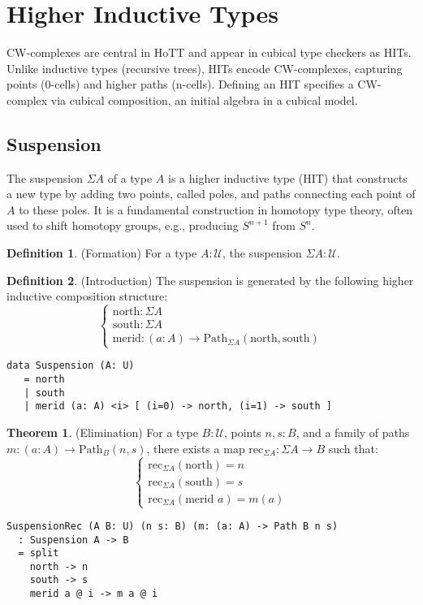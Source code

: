 \documentclass{article}
\theoremstyle{definition}
\newtheorem{theorem}{Theorem}
\newtheorem{definition}{Definition}
\begin{document}
\newpage
\section{Higher Inductive Types}
CW-complexes are central in HoTT and appear in cubical type checkers as HITs. Unlike inductive types (recursive trees), HITs encode CW-complexes, capturing points (0-cells) and higher paths (n-cells). Defining an HIT specifies a CW-complex via cubical composition, an initial algebra in a cubical model.

\subsection{Suspension}
The suspension $\Sigma A$ of a type $A$ is a higher inductive type (HIT) that constructs a new type by adding two points, called poles, and paths connecting each point of $A$ to these poles. It is a fundamental construction in homotopy type theory, often used to shift homotopy groups, e.g., producing $S^{n+1}$ from $S^n$.

\begin{definition} (Formation)
For a type $A : \mathcal{U}$, the suspension $\Sigma A : \mathcal{U}$.
\end{definition}

\begin{definition} (Introduction)
The suspension is generated by the following higher inductive composition structure:
\[
\begin{cases}
\text{north} : \Sigma A \\
\text{south} : \Sigma A \\
\text{merid} : (a : A) \to \text{Path}_{\Sigma A} (\text{north}, \text{south})
\end{cases}
\]
\begin{lstlisting}
data Suspension (A: U)
   = north
   | south
   | merid (a: A) <i> [ (i=0) -> north, (i=1) -> south ]
\end{lstlisting}
\end{definition}

\begin{theorem} (Elimination)
For a type $B : \mathcal{U}$, points $n, s : B$, and a family of paths $m : (a : A) \to \text{Path}_B (n, s)$, there exists a map $\text{rec}_{\Sigma A} : \Sigma A \to B$ such that:
\[
\begin{cases}
\text{rec}_{\Sigma A}(\text{north}) = n \\
\text{rec}_{\Sigma A}(\text{south}) = s \\
\text{rec}_{\Sigma A}(\text{merid } a) = m(a)
\end{cases}
\]
\begin{lstlisting}
SuspensionRec (A B: U) (n s: B) (m: (a: A) -> Path B n s)
  : Suspension A -> B
  = split
    north -> n
    south -> s
    merid a @ i -> m a @ i
\end{lstlisting}
\end{theorem}
\end{document}

